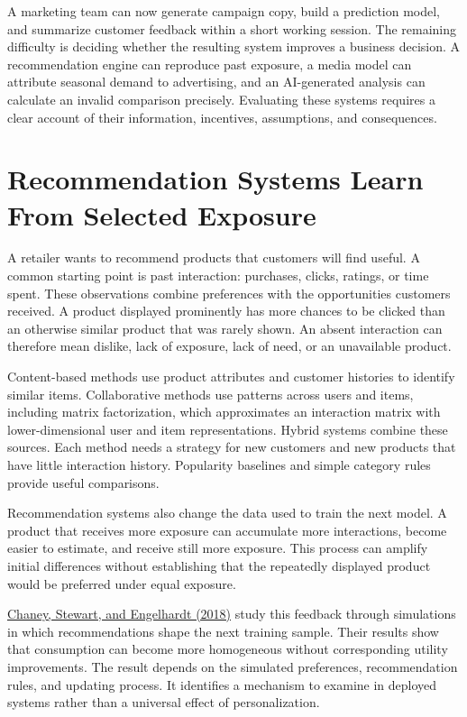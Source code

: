 \noindent A marketing team can now generate campaign copy, build a prediction
model, and summarize customer feedback within a short working session.
The remaining difficulty is deciding whether the resulting system
improves a business decision. A recommendation engine can reproduce past
exposure, a media model can attribute seasonal demand to advertising,
and an AI-generated analysis can calculate an invalid comparison
precisely. Evaluating these systems requires a clear account of their
information, incentives, assumptions, and consequences.

\hypertarget{M08-recommendation-systems-learn-from-selected-exposure}{%
\section{Recommendation Systems Learn From Selected
Exposure}\label{M08-recommendation-systems-learn-from-selected-exposure}}

\noindent A retailer wants to recommend products that customers will find useful.
A common starting point is past interaction: purchases, clicks, ratings,
or time spent. These observations combine preferences with the
opportunities customers received. A product displayed prominently has
more chances to be clicked than an otherwise similar product that was
rarely shown. An absent interaction can therefore mean dislike, lack of
exposure, lack of need, or an unavailable product.

Content-based methods use product attributes and customer histories to
identify similar items. Collaborative methods use patterns across users
and items, including matrix factorization, which approximates an
interaction matrix with lower-dimensional user and item representations.
Hybrid systems combine these sources. Each method needs a strategy for
new customers and new products that have little interaction history.
Popularity baselines and simple category rules provide useful
comparisons.

Recommendation systems also change the data used to train the next
model. A product that receives more exposure can accumulate more
interactions, become easier to estimate, and receive still more
exposure. This process can amplify initial differences without
establishing that the repeatedly displayed product would be preferred
under equal exposure.

\href{https://arxiv.org/abs/1710.11214}{Chaney, Stewart, and Engelhardt
(2018)} study this feedback through simulations in which recommendations
shape the next training sample. Their results show that consumption can
become more homogeneous without corresponding utility improvements. The
result depends on the simulated preferences, recommendation rules, and
updating process. It identifies a mechanism to examine in deployed
systems rather than a universal effect of personalization.

